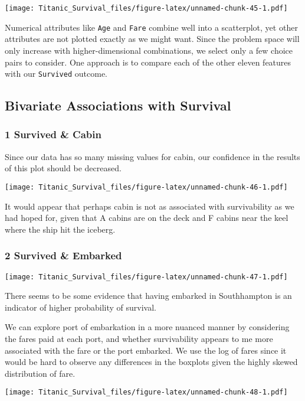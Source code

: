 \documentclass[]{article}
\begin{document}
\texttt{[image: Titanic\_Survival\_files/figure-latex/unnamed-chunk-45-1.pdf]}

Numerical attributes like \texttt{Age} and \texttt{Fare} combine well
into a scatterplot, yet other attributes are not plotted exactly as we
might want. Since the problem space will only increase with
higher-dimensional combinations, we select only a few choice pairs to
consider. One approach is to compare each of the other eleven features
with our \texttt{Survived} outcome.

\subsection{Bivariate Associations with
Survival}\label{bivariate-associations-with-survival}

\subsubsection{1 Survived \& Cabin}\label{survived-cabin}

Since our data has so many missing values for cabin, our confidence in
the results of this plot should be decreased.

\texttt{[image: Titanic\_Survival\_files/figure-latex/unnamed-chunk-46-1.pdf]}

It would appear that perhaps cabin is not as associated with
survivability as we had hoped for, given that A cabins are on the deck
and F cabins near the keel where the ship hit the iceberg.

\subsubsection{2 Survived \& Embarked}\label{survived-embarked}

\texttt{[image: Titanic\_Survival\_files/figure-latex/unnamed-chunk-47-1.pdf]}

There seems to be some evidence that having embarked in Southhampton is
an indicator of higher probability of survival.

We can explore port of embarkation in a more nuanced manner by
considering the fares paid at each port, and whether survivability
appears to me more associated with the fare or the port embarked. We use
the log of fares since it would be hard to observe any differences in
the boxplots given the highly skewed distribution of fare.

\texttt{[image: Titanic\_Survival\_files/figure-latex/unnamed-chunk-48-1.pdf]}
\end{document}
